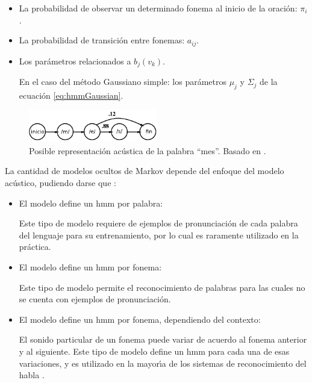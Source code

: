 \begin{enumerate}[A)]
	\begin{itemize}
		\item La probabilidad de observar un determinado fonema al inicio de la oraci\'on: $\pi_i$.
		\item La probabilidad de transici\'on entre fonemas: $a_{ij}$.
		\item Los par\'ametros relacionados a $b_j(v_k)$. 

		En el caso del m\'etodo Gaussiano simple: los par\'ametros $\mu_j$ y $\Sigma_j$ de la 
		ecuaci\'on \ref{eq:hmmGaussian}.
	\end{itemize}

\end{enumerate}

\begin{figure}[H] 
\centering
\includegraphics[width=0.5\textwidth]{./graphics/hmm_palabra.png}
\caption{Posible representaci\'on ac\'ustica de la palabra ``mes''. Basado en \cite{Jurafsky}.}
\label{figure:hmm-palabra}
\end{figure}

La cantidad de modelos ocultos de Markov depende del enfoque del modelo ac\'ustico, pudiendo darse 
que \cite{Livescu2012}:

\begin{itemize}
 	\item El modelo define un \gls{hmm} por palabra:


 		Este tipo de modelo requiere de ejemplos de pronunciaci\'on de cada palabra del lenguaje para 
 		su entrenamiento, por lo cual es raramente utilizado en la pr\'actica.
 	\item El modelo define un \gls{hmm} por fonema:


 		Este tipo de modelo permite el reconocimiento
 		de palabras para las cuales no se cuenta con ejemplos de pronunciaci\'on.
 	\item El modelo define un \gls{hmm} por fonema, dependiendo del contexto:


 		El sonido particular de un fonema puede variar de acuerdo al fonema anterior y al siguiente.
 		Este tipo de modelo define un \gls{hmm} para cada una de esas variaciones, y es utilizado
 		en la mayor{\'\i}a de los sistemas de reconocimiento del habla \cite{Odell95theuse}.
 \end{itemize}  

